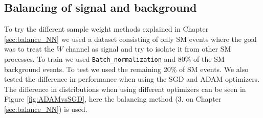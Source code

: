 \documentclass[12pt, a4paper]{book}
\begin{document}
\subsection{Balancing of signal and background}\label{sec:NN_balance_rst}
To try the different sample weight methods explained in Chapter \ref{sec:balance_NN} we used a dataset consisting of only SM events where the goal was to treat the $W$ channel as signal and try to isolate it from other SM processes. To train we used \verb|Batch_normalization| and 80\% of the SM background events. 
To test we used the remaining 20\% of SM events. We also tested the difference in performance when using the SGD and ADAM optimizers. The difference in distributions when using different optimizers can be seen in Figure \ref{fig:ADAMvsSGD}, here the balancing method (3. on Chapter \ref{sec:balance_NN}) is used.
\graphicspath{{../../../Plots/NeuralNetwork/W/}} 
\end{document}
